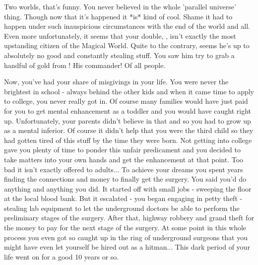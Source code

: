 \documentclass[char]{guildcamp3}
\begin{document}
\name{\cSpecOpOne{}}

\updatemacro{\cNPC}{
  \unknownplayer %
  }



Two worlds, that's funny. You never believed in the whole 'parallel universe' thing. Though now that it's happened it *is* kind of cool. Shame it had to happen under such inauspicious circumstances with the end of the world and all. Even more unfortunately, it seems that your double, \cRogueTwo{\intro}, isn't exactly the most upstanding citizen of the Magical World. Quite to the contrary, seems he's up to absolutely no good and constantly stealing stuff. You saw him try to grab a handful of gold from \cNobleTwo{\intro}! His commander! Of all people. 

Now, you've had your share of misgivings in your life. You were never the brightest in school - always behind the other kids and when it came time to apply to college, you never really got in. Of course many families would have just paid for you to get mental enhancement as a toddler and you would have caught right up. Unfortunately, your parents didn't believe in that and so you had to grow up as a mental inferior. Of course it didn't help that you were the third child so they had gotten tired of this stuff by the time they were born. Not getting into college gave you plenty of time to ponder this unfair predicament and you decided to take matters into your own hands and get the enhancement at that point. Too bad it isn't exactly offered to adults... To achieve your dreams you spent years finding the connections and money to finally get the surgery. You said you'd do anything and anything you did. It started off with small jobs - sweeping the floor at the local blood bank. But it escalated - you began engaging in petty theft - stealing lab equipment to let the underground doctors be able to perform the preliminary stages of the surgery. After that, highway robbery and grand theft for the money to pay for the next stage of the surgery. At some point in this whole process you even got so caught up in the ring of underground surgeons that you might have even let yourself be hired out as a hitman... This dark period of your life went on for a good 10 years or so.
\end{document}
